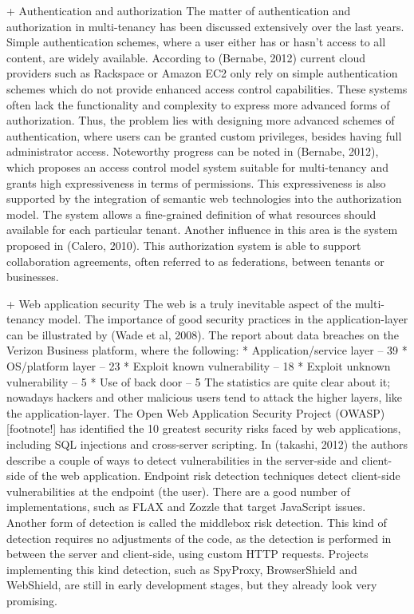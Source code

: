 + Authentication and authorization
The matter of authentication and authorization in multi-tenancy has been discussed extensively over the last years. Simple authentication schemes, where a user either has or hasn’t access to all content, are widely available. According to (Bernabe, 2012) current cloud providers such as Rackspace or Amazon EC2 only rely on simple authentication schemes which do not provide enhanced access control capabilities. These systems often lack the functionality and complexity to express more advanced forms of authorization. Thus, the problem lies with designing more advanced schemes of authentication, where users can be granted custom privileges, besides having full administrator access.
Noteworthy progress can be noted in (Bernabe, 2012), which proposes an access control model system suitable for multi-tenancy and grants high expressiveness in terms of permissions. This expressiveness is also supported by the integration of semantic web technologies into the authorization model. The system allows a fine-grained definition of what resources should available for each particular tenant. Another influence in this area is the system proposed in (Calero, 2010). This authorization system is able to support collaboration agreements, often referred to as federations, between tenants or businesses.

+ Web application security
The web is a truly inevitable aspect of the multi-tenancy model. The importance of good security practices in the application-layer can be illustrated by (Wade et al, 2008). The report about data breaches on the Verizon Business platform, where the following:
* Application/service layer – 39%
* OS/platform layer – 23%
* Exploit known vulnerability – 18%
* Exploit unknown vulnerability – 5%
* Use of back door – 5%
The statistics are quite clear about it; nowadays hackers and other malicious users tend to attack the higher layers, like the application-layer. The Open Web Application Security Project (OWASP) [footnote!] has identified the 10 greatest security risks faced by web applications, including SQL injections and cross-server scripting. 
In (takashi, 2012) the authors describe a couple of ways to detect vulnerabilities in the server-side and client-side of the web application. Endpoint risk detection techniques detect client-side vulnerabilities at the endpoint (the user). There are a good number of implementations, such as FLAX and Zozzle that target JavaScript issues. Another form of detection is called the middlebox risk detection. This kind of detection requires no adjustments of the code, as the detection is performed in between the server and client-side, using custom HTTP requests. Projects implementing this kind detection, such as SpyProxy, BrowserShield and WebShield, are still in early development stages, but they already look very promising.


